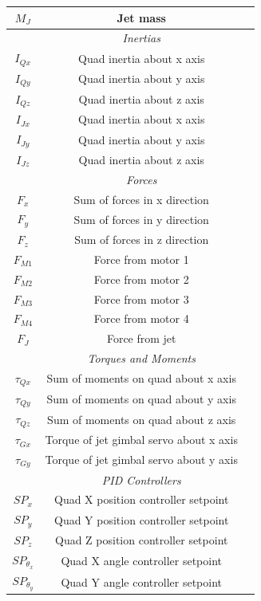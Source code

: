 \documentclass[10pt]{article}
\begin{document}
\begin{center}
\begin{longtable}{|ccc|}
    $M_J$ & Jet mass & \\
    \hline
    & \emph{Inertias} & \\
    \hline
    $I_{Qx}$ & Quad inertia about x axis & \\
    $I_{Qy}$ & Quad inertia about y axis & \\
    $I_{Qz}$ & Quad inertia about z axis & \\
    $I_{Jx}$ & Quad inertia about x axis & \\
    $I_{Jy}$ & Quad inertia about y axis & \\
    $I_{Jz}$ & Quad inertia about z axis & \\
    \hline
    & \emph{Forces} & \\
    \hline
    $F_x$ & Sum of forces in x direction & \\
    $F_y$ & Sum of forces in y direction & \\
    $F_z$ & Sum of forces in z direction & \\
    $F_{M1}$ & Force from motor 1 & \\
    $F_{M2}$ & Force from motor 2 & \\
    $F_{M3}$ & Force from motor 3 & \\
    $F_{M4}$ & Force from motor 4 & \\
    $F_J$ & Force from jet & \\
    \hline
    & \emph{Torques and Moments} & \\
    \hline
    $\tau_{Qx}$ & Sum of moments on quad about x axis & \\
    $\tau_{Qy}$ & Sum of moments on quad about y axis & \\
    $\tau_{Qz}$ & Sum of moments on quad about z axis & \\
    $\tau_{Gx}$ & Torque of jet gimbal servo about x axis & \\
    $\tau_{Gy}$ & Torque of jet gimbal servo about y axis & \\
    \hline
    & \emph{PID Controllers} & \\
    \hline
    $SP_x$ & Quad X position controller setpoint & \\
    $SP_y$ & Quad Y position controller setpoint & \\
    $SP_z$ & Quad Z position controller setpoint & \\
    $SP_{\theta_x}$ & Quad X angle controller setpoint & \\
    $SP_{\theta_y}$ & Quad Y angle controller setpoint & \\

\end{longtable}
\end{center}
\end{document}
